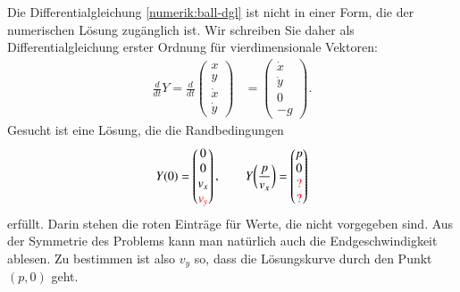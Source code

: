 Die Differentialgleichung \eqref{numerik:ball-dgl} ist nicht in einer
Form, die der numerischen Lösung zugänglich ist.
Wir schreiben Sie daher als Differentialgleichung erster Ordnung 
für vierdimensionale Vektoren:
\begin{align}
\frac{d}{dt}Y
=
\frac{d}{dt}\begin{pmatrix}x\\y\\\dot x\\\dot y\end{pmatrix}
&=
\begin{pmatrix}\dot x\\\dot y\\ 0\\ -g\end{pmatrix}.
\label{numerik:ball-dgl-1}
\end{align}
Gesucht ist eine Lösung, die die Randbedingungen
\begin{equation}
Y(0)
=
\begin{pmatrix}0\\0\\v_x\\\color{red}v_y\end{pmatrix},
\qquad
Y\biggl(\frac{p}{v_x}\biggr)
=
\begin{pmatrix}p\\0\\\color{red}?\\\color{red}?\end{pmatrix}
\label{numerik:ball-dgl-2}
\end{equation}
erfüllt.
Darin stehen die roten Einträge für Werte, die nicht vorgegeben sind.
Aus der Symmetrie des Problems kann man natürlich auch die Endgeschwindigkeit
ablesen.
%
%
Zu bestimmen ist also $v_y$ so, dass die Lösungskurve durch den Punkt
$(p,0)$ geht.
%

